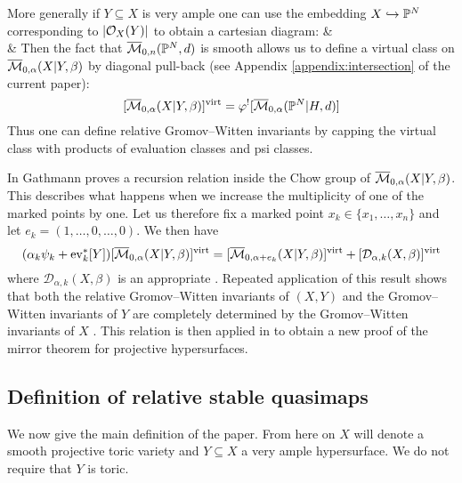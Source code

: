 More generally if $Y \subseteq X$ is very ample one can use the embedding $X \hookrightarrow \mathbb P^N$ corresponding to $|\mathcal{O}_X(Y)|$ to obtain a cartesian diagram:
\bcd
{} \ar[r] \ar[d]  &  \ar[d] \\
 \ar[r,"\varphi"] & 
\ecd
Then the fact that $\overline{\mathcal M}_{0,n}(\mathbb P^N,d)$ is smooth allows us to define a virtual class on $\overline{\mathcal M}_{0,\alpha}(X|Y,\beta)$ by diagonal pull-back (see Appendix \ref{appendix:intersection} of the current paper):
\begin{equation*} [\overline{\mathcal M}_{0,\alpha}(X|Y,\beta)]^{\operatorname{virt}} = \varphi^! [\overline{\mathcal M}_{0,\alpha}(\mathbb P^N|H,d)] \end{equation*}
Thus one can define relative Gromov--Witten invariants by capping the virtual class with products of evaluation classes and psi classes.

In \cite[\S\S 2-4]{Ga} Gathmann proves a recursion relation inside the Chow group of $\overline{\mathcal M}_{0,\alpha}(X|Y,\beta)$. This describes what happens when we increase the multiplicity of one of the marked points by one. Let us therefore fix a marked point $x_k \in \{ x_1, \ldots, x_n \}$ and let $e_k = (1,\ldots,0,\ldots,0)$. We then have
\begin{equation*} (\alpha_k \psi_k + \operatorname{ev}_k^* [Y]) [\overline{\mathcal M}_{0,\alpha}(X|Y,\beta)]^{\operatorname{virt}} = [\overline{\mathcal M}_{0,\alpha+e_k}(X|Y,\beta)]^{\operatorname{virt}} + [\mathcal{D}_{\alpha,k}(X,\beta)]^{\operatorname{virt}} \end{equation*}
where $\mathcal{D}_{\alpha,k}(X,\beta)$ is an appropriate . Repeated application of this result shows that both the relative Gromov--Witten invariants of $(X,Y)$ and the Gromov--Witten invariants of $Y$ are completely determined by the Gromov--Witten invariants of $X$ \cite[Corollary 5.7]{Ga}. This relation is then applied in \cite{Ga-MF} to obtain a new proof of the mirror theorem for projective hypersurfaces.

\subsection{Definition of relative stable quasimaps} \label{Subsection relative stable quasimaps}

We now give the main definition of the paper. From here on $X$ will denote a smooth projective toric variety and $Y \subseteq X$ a very ample hypersurface. We do not require that $Y$ is toric.

